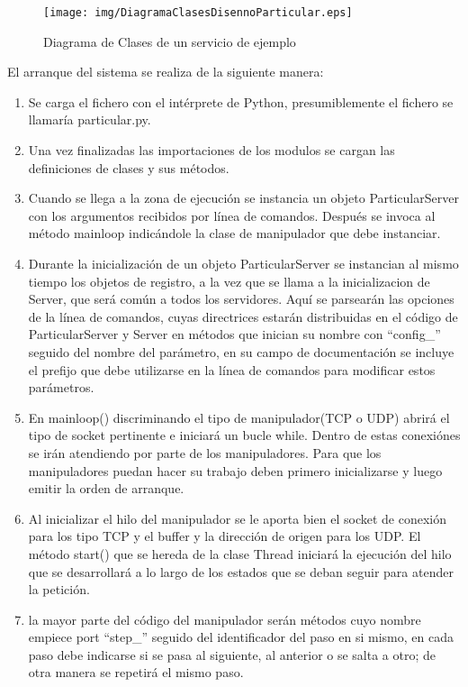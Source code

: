 \documentclass[a4paper,spanish,12pt]{book}
\begin{document}
\begin{figure}[h]
	\texttt{[image: img/DiagramaClasesDisennoParticular.eps]}
	\caption{Diagrama de Clases de un servicio de ejemplo} 
	      \label{fig:DiagramaClasesDiseñoParticular}
\end{figure}
El arranque del sistema se realiza de la siguiente manera:
\begin{enumerate}
	\item Se carga el fichero con el intérprete de Python, presumiblemente el fichero se llamaría particular.py.
	\item Una vez finalizadas las importaciones de los modulos se cargan las definiciones de clases y sus m\'etodos.
	\item Cuando se llega a la zona de ejecución se instancia un objeto ParticularServer con los argumentos recibidos por línea de comandos. Despu\'es se invoca al m\'etodo mainloop indicándole la clase de manipulador que debe instanciar.
	\item Durante la inicialización de un objeto ParticularServer se instancian al mismo tiempo los objetos de registro, a la vez que se llama a la inicializacion de Server, que será común a todos los servidores. Aquí se parsearán las opciones de la línea de comandos, cuyas directrices estarán distribuidas en el código de ParticularServer y Server en m\'etodos que inician su nombre con ``config\_'' seguido del nombre del parámetro, en su campo de documentación se incluye el prefijo que debe utilizarse en la línea de comandos para modificar estos parámetros.
	\item En mainloop() discriminando el tipo de manipulador(TCP o UDP) abrirá el tipo de socket pertinente e iniciará un bucle while. Dentro de estas conexiónes se irán atendiendo por parte de los manipuladores. Para que los manipuladores puedan hacer su trabajo deben primero inicializarse y luego emitir la orden de arranque.
	\item Al inicializar el hilo del manipulador se le aporta bien el socket de conexión para los tipo TCP y el buffer y la dirección de origen para los UDP. El m\'etodo start() que se hereda de la clase Thread iniciará la ejecución del hilo que se desarrollará a lo largo de los estados que se deban seguir para atender la petición.
	\item la mayor parte del código del manipulador serán m\'etodos cuyo nombre empiece port ``step\_'' seguido del identificador del paso en si mismo, en cada paso debe indicarse si se pasa al siguiente, al anterior o se salta a otro; de otra manera se repetirá el mismo paso.
\end{enumerate}
\end{document}

